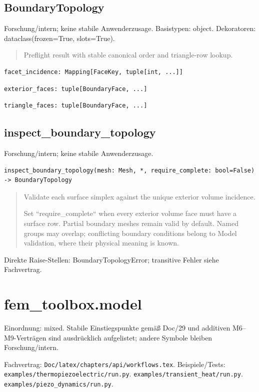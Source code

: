 \subsection{BoundaryTopology}
Forschung/intern; keine stabile Anwenderzusage.
Basistypen: object. Dekoratoren: dataclass(frozen=True, slots=True).
\begin{quote}
Preflight result with stable canonical order and triangle-row lookup.
\end{quote}
\begin{lstlisting}
facet_incidence: Mapping[FaceKey, tuple[int, ...]]
\end{lstlisting}
\begin{lstlisting}
exterior_faces: tuple[BoundaryFace, ...]
\end{lstlisting}
\begin{lstlisting}
triangle_faces: tuple[BoundaryFace, ...]
\end{lstlisting}
\subsection{inspect\_boundary\_topology}
Forschung/intern; keine stabile Anwenderzusage.
\begin{lstlisting}
inspect_boundary_topology(mesh: Mesh, *, require_complete: bool=False) -> BoundaryTopology
\end{lstlisting}
\begin{quote}
Validate each surface simplex against the unique exterior volume incidence.\par Set ``require\_complete`` when every exterior volume face must have a surface row. Partial boundary meshes remain valid by default. Named groups may overlap; conflicting boundary conditions belong to Model validation, where their physical meaning is known.
\end{quote}
Direkte Raise-Stellen: BoundaryTopologyError; transitive Fehler siehe Fachvertrag.
\section{fem\_toolbox.model}
Einordnung: mixed. Stabile Einstiegspunkte gemäß Doc/29 und additiven M6–M9-Verträgen sind ausdrücklich aufgelistet; andere Symbole bleiben Forschung/intern.
\par Fachvertrag: \nolinkurl{Doc/latex/chapters/api/workflows.tex}. Beispiele/Tests:
\nolinkurl{examples/thermopiezoelectric/run.py}.
\nolinkurl{examples/transient_heat/run.py}.
\nolinkurl{examples/piezo_dynamics/run.py}.
